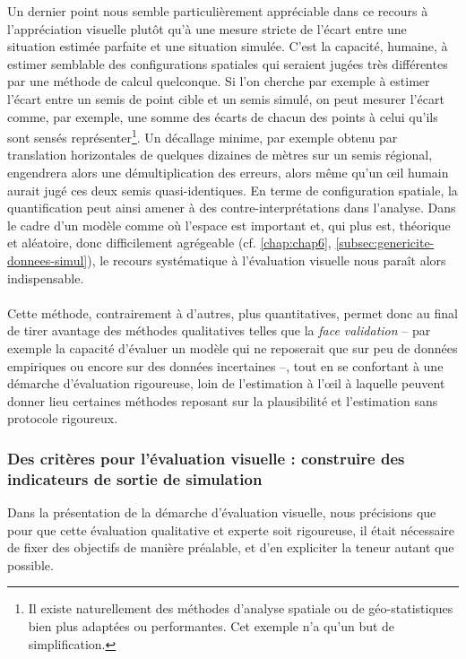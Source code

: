 Un dernier point nous semble particulièrement appréciable dans ce recours à l'appréciation visuelle plutôt qu'à une mesure stricte de l'écart entre une situation estimée parfaite et une situation simulée.
C'est la capacité, humaine, à estimer semblable des configurations spatiales qui seraient jugées très différentes par une méthode de calcul quelconque.
Si l'on cherche par exemple à estimer l'écart entre un semis de point cible et un semis simulé, on peut mesurer l'écart comme, par exemple, une somme des écarts de chacun des points à celui qu'ils sont sensés représenter\footnote{
	Il existe naturellement des méthodes d'analyse spatiale ou de géo-statistiques bien plus adaptées ou performantes.
	Cet exemple n'a qu'un but de simplification.
}.
Un décallage minime, par exemple obtenu par translation horizontales de quelques dizaines de mètres sur un semis régional, engendrera alors une démultiplication des erreurs, alors même qu'un œil humain aurait jugé ces deux semis quasi-identiques.
En terme de configuration spatiale, la quantification peut ainsi amener à des contre-interprétations dans l'analyse.
Dans le cadre d'un modèle comme \simfeodal{} où l'espace est important et, qui plus est, théorique et aléatoire, donc difficilement agrégeable (cf. \cref{chap:chap6}, \cref{subsec:genericite-donnees-simul}), le recours systématique à l'évaluation visuelle nous paraît alors indispensable.

\paragraph*{}Cette méthode, contrairement à d'autres, plus quantitatives, permet donc au final de tirer avantage des méthodes qualitatives telles que la \textit{face validation} -- par exemple la capacité d'évaluer un modèle qui ne reposerait que sur peu de données empiriques ou encore sur des données incertaines --, tout en se confortant à une démarche d'évaluation rigoureuse, loin de l'estimation \og à l'œil\fg{} à laquelle peuvent donner lieu certaines méthodes reposant sur la plausibilité et l'estimation sans protocole rigoureux.

\subsubsection{Des critères pour l'évaluation visuelle : construire des indicateurs de sortie de simulation}

Dans la présentation de la démarche d'évaluation visuelle, nous précisions que pour que cette évaluation qualitative et experte soit rigoureuse, il était nécessaire de fixer des objectifs de manière préalable, et d'en expliciter la teneur autant que possible.

